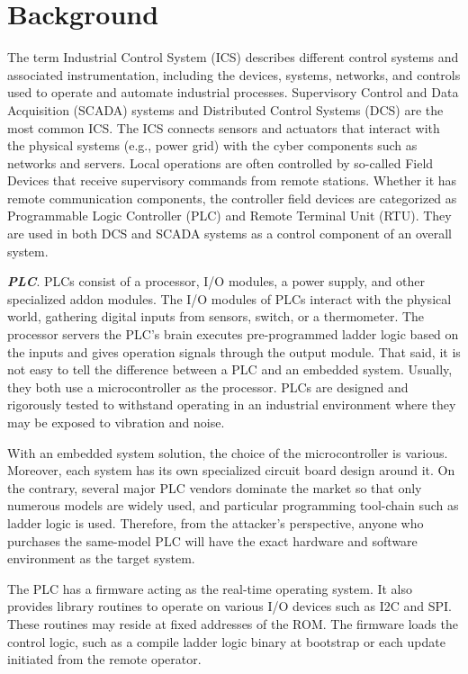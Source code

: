 \section{Background}
\label{sec:background}


The term Industrial Control System (ICS) describes different control systems and associated instrumentation, including the devices, systems, networks, and controls used to operate and automate industrial processes. Supervisory Control and Data Acquisition (SCADA) systems and Distributed Control Systems (DCS) are the most common ICS. The ICS connects sensors and actuators that interact with the physical systems (e.g., power grid) with the cyber components such as networks and servers. Local operations are often controlled by so-called Field Devices that receive supervisory commands from remote stations. Whether it has remote communication components, the controller field devices are categorized as Programmable Logic Controller (PLC) and Remote Terminal Unit (RTU). They are used in both DCS and SCADA systems as a control component of an overall system. 

\textbf{\textit{PLC}}. PLCs consist of a processor, I/O modules, a power supply, and other specialized addon modules. The I/O modules of PLCs interact with the physical world, gathering digital inputs from sensors, switch, or a thermometer. The processor servers the PLC's brain executes pre-programmed ladder logic based on the inputs and gives operation signals through the output module. That said, it is not easy to tell the difference between a PLC and an embedded system. Usually, they both use a microcontroller as the processor. PLCs are designed and rigorously tested to withstand operating in an industrial environment where they may be exposed to vibration and noise. 

With an embedded system solution, the choice of the microcontroller is various. Moreover, each system has its own specialized circuit board design around it. On the contrary, several major PLC vendors dominate the market so that only numerous models are widely used, and particular programming tool-chain such as ladder logic is used. Therefore, from the attacker's perspective, anyone who purchases the same-model PLC will have the exact hardware and software environment as the target system.

The PLC has a firmware acting as the real-time operating system. It also provides library routines to operate on various I/O devices such as I2C and SPI. These routines may reside at fixed addresses of the ROM. The firmware loads the control logic, such as a compile ladder logic binary at bootstrap or each update initiated from the remote operator.

